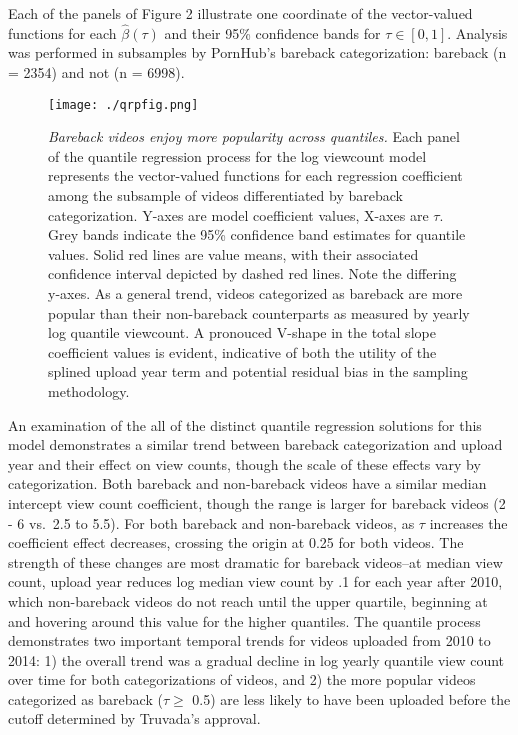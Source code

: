 \documentclass[]{article}
\begin{document}
Each of the panels of Figure 2 illustrate one coordinate of the
vector-valued functions for each \(\hat{\beta}\left (\tau \right )\) and
their 95\% confidence bands for \(\tau \in \left [0,1 \right ]\).
Analysis was performed in subsamples by PornHub's bareback
categorization: bareback (n = 2354) and not (n = 6998).

\begin{figure}
\centering
\texttt{[image: ./qrpfig.png]}
\caption{\emph{Bareback videos enjoy more popularity across quantiles.}
Each panel of the quantile regression process for the log viewcount
model represents the vector-valued functions for each regression
coefficient among the subsample of videos differentiated by bareback
categorization. Y-axes are model coefficient values, X-axes are
\(\tau\). Grey bands indicate the 95\% confidence band estimates for
quantile values. Solid red lines are value means, with their associated
confidence interval depicted by dashed red lines. Note the differing
y-axes. As a general trend, videos categorized as bareback are more
popular than their non-bareback counterparts as measured by yearly log
quantile viewcount. A pronouced V-shape in the total slope coefficient
values is evident, indicative of both the utility of the splined upload
year term and potential residual bias in the sampling methodology.}
\end{figure}

An examination of the all of the distinct quantile regression solutions
for this model demonstrates a similar trend between bareback
categorization and upload year and their effect on view counts, though
the scale of these effects vary by categorization. Both bareback and
non-bareback videos have a similar median intercept view count
coefficient, though the range is larger for bareback videos (2 - 6
vs.~2.5 to 5.5). For both bareback and non-bareback videos, as \(\tau\)
increases the coefficient effect decreases, crossing the origin at
 0.25 for both videos. The strength of these changes are
most dramatic for bareback videos--at median view count, upload year
reduces log median view count by .1 for each year after 2010, which
non-bareback videos do not reach until the upper quartile, beginning at
 and hovering around this value for the higher quantiles.
The quantile process demonstrates two important temporal trends for
videos uploaded from 2010 to 2014: 1) the overall trend was a gradual
decline in log yearly quantile view count over time for both
categorizations of videos, and 2) the more popular videos categorized as
bareback (\(\tau \geq\) 0.5) are less likely to have been uploaded
before the cutoff determined by Truvada's approval.
\end{document}

